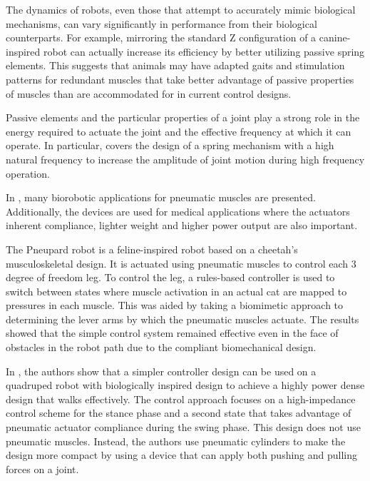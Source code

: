 
The dynamics of robots, even those that attempt to accurately mimic biological
mechanisms, can vary significantly in performance from their biological
counterparts. For example, mirroring the standard Z configuration of a canine-
inspired robot can actually increase its efficiency by better utilizing passive
spring elements. This suggests that animals may have adapted gaits and
stimulation patterns for redundant muscles that take better advantage of passive
properties of muscles than are accommodated for in current control designs.
\cite{HindLegMorphology}

Passive elements and the particular properties of a joint play a strong role in
the energy required to actuate the joint and the effective frequency at which it
can operate. In particular, \cite{Na2015} covers the design of a spring
mechanism with a high natural frequency to increase the amplitude of joint
motion during high frequency operation.



In \cite{PAMApplicationSurvey}, many biorobotic applications for pneumatic
muscles are presented.
Additionally, the devices are used for medical applications where the actuators
inherent compliance, lighter weight and higher power output are also important. 

The Pneupard robot is a feline-inspired robot based on a cheetah's
musculoskeletal design. It is actuated using pneumatic muscles to control each 3
degree of freedom leg. To control the leg, a rules-based controller is used to switch between
states where muscle activation in an actual cat are mapped to pressures in each
muscle. This was aided by taking a biomimetic approach to determining the lever
arms by which the pneumatic muscles actuate. The results showed that the simple
control system remained effective even in the face of obstacles in the robot
path due to the compliant biomechanical design.
\cite{Pneupard2013}

In \cite{Wait2014}, the authors show that a simpler controller design can be
used on a quadruped robot with biologically inspired design to achieve a highly
power dense design that walks effectively. The control approach focuses on
a high-impedance control scheme for the stance phase and a second state
that takes advantage of pneumatic actuator compliance during the swing phase.
This design does not use pneumatic muscles. Instead, the authors use pneumatic
cylinders to make the design more compact by using a device that can apply both
pushing and pulling forces on a joint. 

